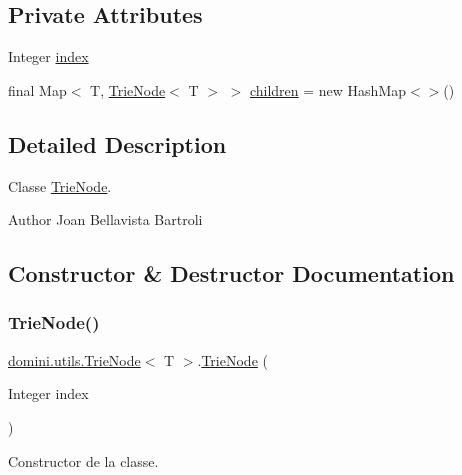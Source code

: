 \subsection*{Private Attributes}
\begin{DoxyCompactItemize}
\item 
Integer \hyperlink{classdomini_1_1utils_1_1TrieNode_a9c247bc6568131e5e6ad0758adb67bfa}{index}
\item 
final Map$<$ T, \hyperlink{classdomini_1_1utils_1_1TrieNode}{Trie\+Node}$<$ T $>$ $>$ \hyperlink{classdomini_1_1utils_1_1TrieNode_ae64d9c12696f526eecb3ff15aa290640}{children} = new Hash\+Map$<$$>$()
\end{DoxyCompactItemize}


\subsection{Detailed Description}
Classe \hyperlink{classdomini_1_1utils_1_1TrieNode}{Trie\+Node}. 

\begin{DoxyAuthor}{Author}
Joan Bellavista Bartroli 
\end{DoxyAuthor}


\subsection{Constructor \& Destructor Documentation}
\mbox{\label{classdomini_1_1utils_1_1TrieNode_af9a18353151b5e3dea5966f50629319a}} 
\subsubsection{\texorpdfstring{Trie\+Node()}{TrieNode()}}
{\footnotesize\ttfamily \hyperlink{classdomini_1_1utils_1_1TrieNode}{domini.\+utils.\+Trie\+Node}$<$ T $>$.\hyperlink{classdomini_1_1utils_1_1TrieNode}{Trie\+Node} (\begin{DoxyParamCaption}\item[{Integer}]{index }\end{DoxyParamCaption})\hspace{0.3cm}{\ttfamily [inline]}}



Constructor de la classe. 


